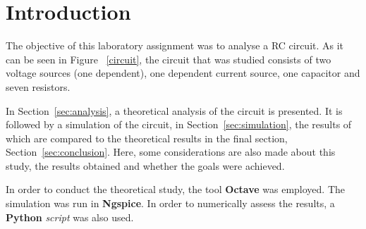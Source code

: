 \section{Introduction}
\label{sec:introduction}

The objective of this laboratory assignment was to analyse a RC circuit. As it can be seen in Figure ~\ref{circuit}, the circuit that was studied consists of two voltage sources (one dependent), one dependent current source, one capacitor and seven resistors.

In Section~\ref{sec:analysis}, a theoretical analysis of the circuit is presented. It is followed by a simulation of the circuit, in Section~\ref{sec:simulation}, the results of which are compared to the theoretical results in the final section, Section~\ref{sec:conclusion}. Here, some  considerations are also made about this study, the results obtained and whether the goals were achieved.

In order to conduct the theoretical study, the tool {\bf Octave} was employed. The simulation was run in {\bf Ngspice}. In order to numerically assess the results, a {\bf Python} {\it script} was also used.




